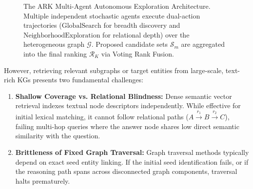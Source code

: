 \documentclass[11pt]{article}
\begin{document}
\begin{figure}[t]
{%
}
\caption{The ARK Multi-Agent Autonomous Exploration Architecture. Multiple independent stochastic agents execute dual-action trajectories ($\text{GlobalSearch}$ for breadth discovery and $\text{NeighborhoodExploration}$ for relational depth) over the heterogeneous graph $\mathcal{G}$. Proposed candidate sets $\mathcal{S}_m$ are aggregated into the final ranking $\mathcal{R}_K$ via Voting Rank Fusion.}
\label{fig:ark_arch}
\end{figure}

However, retrieving relevant subgraphs or target entities from large-scale, text-rich KGs presents two fundamental challenges:
\begin{enumerate}[leftmargin=*]
    \item \textbf{Shallow Coverage vs. Relational Blindness:} Dense semantic vector retrieval indexes textual node descriptors independently. While effective for initial lexical matching, it cannot follow relational paths ($A \xrightarrow{r_1} B \xrightarrow{r_2} C$), failing multi-hop queries where the answer node shares low direct semantic similarity with the question.
    \item \textbf{Brittleness of Fixed Graph Traversal:} Graph traversal methods typically depend on exact seed entity linking. If the initial seed identification fails, or if the reasoning path spans across disconnected graph components, traversal halts prematurely.
\end{enumerate}
\end{document}

